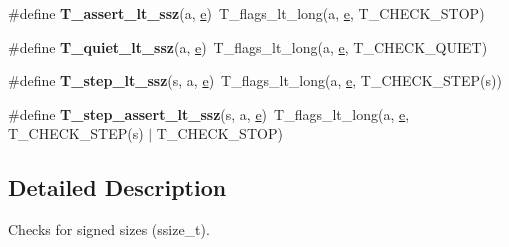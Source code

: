 \begin{DoxyCompactItemize}
\item 
\mbox{\label{group__RTEMSTestFrameworkChecksSSZ_ga8276f6435fbc13ed20c3d9eba955cd4c}} 
\#define {\bfseries T\+\_\+assert\+\_\+lt\+\_\+ssz}(a,  \mbox{\hyperlink{sun4u_2tte_8h_a8b0b9ed08e0e18920ec2682f48228c27}{e}})~T\+\_\+flags\+\_\+lt\+\_\+long(a, \mbox{\hyperlink{sun4u_2tte_8h_a8b0b9ed08e0e18920ec2682f48228c27}{e}}, T\+\_\+\+C\+H\+E\+C\+K\+\_\+\+S\+T\+OP)
\item 
\mbox{\label{group__RTEMSTestFrameworkChecksSSZ_ga21639007624d74db09b57686955406cb}} 
\#define {\bfseries T\+\_\+quiet\+\_\+lt\+\_\+ssz}(a,  \mbox{\hyperlink{sun4u_2tte_8h_a8b0b9ed08e0e18920ec2682f48228c27}{e}})~T\+\_\+flags\+\_\+lt\+\_\+long(a, \mbox{\hyperlink{sun4u_2tte_8h_a8b0b9ed08e0e18920ec2682f48228c27}{e}}, T\+\_\+\+C\+H\+E\+C\+K\+\_\+\+Q\+U\+I\+ET)
\item 
\mbox{\label{group__RTEMSTestFrameworkChecksSSZ_ga7344f79bc4a82c0f5471bad9c7bc610d}} 
\#define {\bfseries T\+\_\+step\+\_\+lt\+\_\+ssz}(s,  a,  \mbox{\hyperlink{sun4u_2tte_8h_a8b0b9ed08e0e18920ec2682f48228c27}{e}})~T\+\_\+flags\+\_\+lt\+\_\+long(a, \mbox{\hyperlink{sun4u_2tte_8h_a8b0b9ed08e0e18920ec2682f48228c27}{e}}, T\+\_\+\+C\+H\+E\+C\+K\+\_\+\+S\+T\+EP(s))
\item 
\mbox{\label{group__RTEMSTestFrameworkChecksSSZ_gad2df262c42dbaa02648119c846338536}} 
\#define {\bfseries T\+\_\+step\+\_\+assert\+\_\+lt\+\_\+ssz}(s,  a,  \mbox{\hyperlink{sun4u_2tte_8h_a8b0b9ed08e0e18920ec2682f48228c27}{e}})~T\+\_\+flags\+\_\+lt\+\_\+long(a, \mbox{\hyperlink{sun4u_2tte_8h_a8b0b9ed08e0e18920ec2682f48228c27}{e}}, T\+\_\+\+C\+H\+E\+C\+K\+\_\+\+S\+T\+EP(s) $\vert$ T\+\_\+\+C\+H\+E\+C\+K\+\_\+\+S\+T\+OP)
\end{DoxyCompactItemize}


\subsection{Detailed Description}
Checks for signed sizes (ssize\+\_\+t). 


